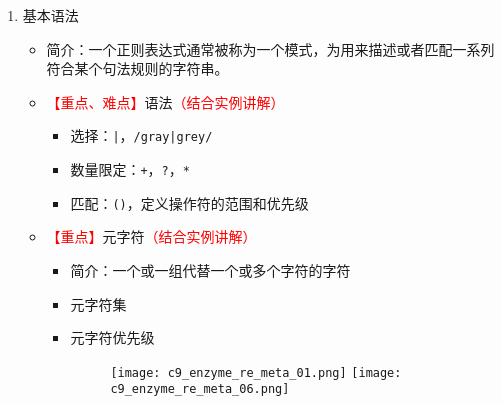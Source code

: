 \documentclass{TIJMUjiaoanLL}
\begin{document}
\begin{enumerate}
\begin{enumerate}
\begin{enumerate}
\begin{itemize}
	    \end{itemize}
	  \item 基本语法
	    \begin{itemize}
	      \item 简介：一个正则表达式通常被称为一个模式，为用来描述或者匹配一系列符合某个句法规则的字符串。
	      \item \textcolor{red}{【重点、难点】}语法\textcolor{red}{（结合实例讲解）}
		\begin{itemize}
		  \item 选择：\verb=|=，\verb=/gray|grey/=
		  \item 数量限定：\verb|+|，\verb|?|，\verb|*|
		  \item 匹配：\verb|()|，定义操作符的范围和优先级
		\end{itemize}
	      \item \textcolor{red}{【重点】}元字符\textcolor{red}{（结合实例讲解）}
		\begin{itemize}
		  \item 简介：一个或一组代替一个或多个字符的字符
		  \item 元字符集
		  \item 元字符优先级
		    \vspace{-1em}
		    \begin{figure}[h]
		        \texttt{[image: c9\_enzyme\_re\_meta\_01.png]}
		        \texttt{[image: c9\_enzyme\_re\_meta\_06.png]}
		    \end{figure}
		    \vspace{-1em}
		\end{itemize}
	    \end{itemize}
	\end{enumerate}

\otherTail
\newpage
\otherHeader


\end{enumerate}
\end{enumerate}
\end{document}
